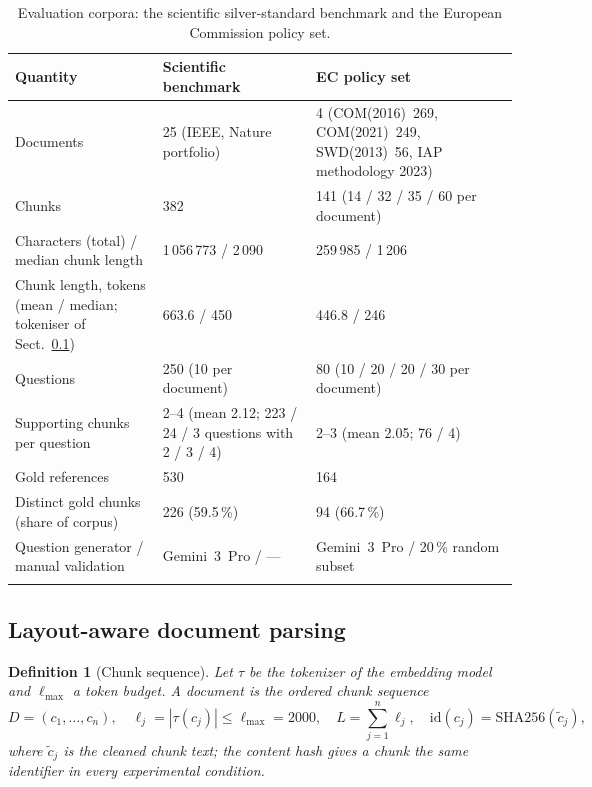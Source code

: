 \documentclass[pdflatex,sn-mathphys-num]{sn-jnl}
\theoremstyle{thmstyleone}%
\theoremstyle{thmstylethree}%
\newtheorem{definition}{Definition}%
\begin{document}
\begin{table}[tbp]
\caption{Evaluation corpora: the scientific silver-standard benchmark and the European Commission policy set.}\label{tab:corpora}
\begin{tabular}{@{}p{4.0cm}p{4.0cm}p{4.2cm}@{}}
\toprule
Quantity & Scientific benchmark & EC policy set \\
\midrule
Documents & 25 (IEEE, Nature portfolio) & 4 (COM(2016)~269, COM(2021)~249, SWD(2013)~56, IAP methodology 2023) \\
Chunks & 382 & 141 (14 / 32 / 35 / 60 per document) \\
Characters (total) / median chunk length & 1\,056\,773 / 2\,090 & 259\,985 / 1\,206 \\
Chunk length, tokens (mean / median; tokeniser of Sect.~\ref{sec:parsing}) & 663.6 / 450 & 446.8 / 246 \\
Questions & 250 (10 per document) & 80 (10 / 20 / 20 / 30 per document) \\
Supporting chunks per question & 2--4 (mean 2.12; 223 / 24 / 3 questions with 2 / 3 / 4) & 2--3 (mean 2.05; 76 / 4) \\
Gold references & 530 & 164 \\
Distinct gold chunks (share of corpus) & 226 (59.5\,\%) & 94 (66.7\,\%) \\
Question generator / manual validation & Gemini~3~Pro / --- & Gemini~3~Pro / 20\,\% random subset \\
\botrule
\end{tabular}
\end{table}

\subsection{Layout-aware document parsing}\label{sec:parsing}

\begin{definition}[Chunk sequence]\label{def:chunks}
Let $\tau$ be the tokenizer of the embedding model and $\ell_{\max}$ a token budget. A document is the ordered chunk sequence
\begin{equation}
D=(c_1,\dots,c_n),\quad \ell_j=|\tau(c_j)|\le \ell_{\max}=2000,\quad L=\sum_{j=1}^{n}\ell_j,\quad \mathrm{id}(c_j)=\mathrm{SHA256}(\tilde c_j),
\end{equation}
where $\tilde c_j$ is the cleaned chunk text; the content hash gives a chunk the same identifier in every experimental condition.
\end{definition}
\end{document}
